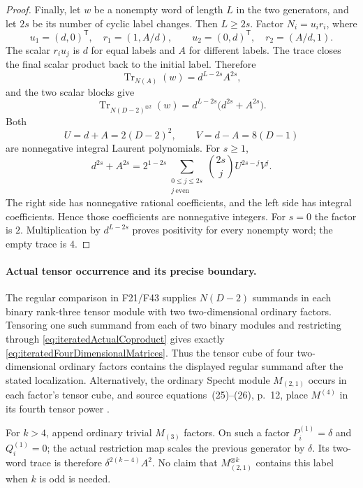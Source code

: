 \documentclass[11pt,a4paper]{article}
\newcommand{\fid}[1]{\textsf{#1}}\newcommand{\gate}[1]{\textsf{#1}}
\theoremstyle{named}\newtheorem{finding}{Finding}[section]
\theoremstyle{definition}\newtheorem{definition}[finding]{Definition}
\theoremstyle{remark}\newtheorem{remark}[finding]{Remark}
\begin{document}
\begin{proof}
Finally, let \(w\) be a nonempty word of length \(L\) in
the two generators, and let \(2s\) be its number of cyclic
label changes. Then \(L\ge2s\). Factor
\(N_i=u_i r_i\), where
\[
 u_1=(d,0)^{\mathsf T},\quad r_1=(1,A/d),\qquad
 u_2=(0,d)^{\mathsf T},\quad r_2=(A/d,1).
\]
The scalar \(r_i u_j\) is \(d\) for equal labels and
\(A\) for different labels. The trace closes the final
scalar product back to the initial label. Therefore
\[
 \operatorname{Tr}_{N(A)}(w)=d^{L-2s}A^{2s},
\]
and the two scalar blocks give
\begin{equation}\label{eq:iteratedAllWordTrace}
 \operatorname{Tr}_{N(D-2)^{\otimes2}}(w)
          =d^{L-2s}\bigl(d^{2s}+A^{2s}\bigr).
\end{equation}
Both
\[
 U=d+A=2(D-2)^2,\qquad V=d-A=8(D-1)
\]
are nonnegative integral Laurent polynomials. For \(s\ge1\),
\[
 d^{2s}+A^{2s}
   =2^{1-2s}
      \sum_{\substack{0\le j\le2s\\ j\ \mathrm{even}}}
        \binom{2s}{j}U^{2s-j}V^j.
\]
The right side has nonnegative rational coefficients,
and the left side has integral coefficients. Hence those
coefficients are nonnegative integers. For \(s=0\) the
factor is \(2\). Multiplication by \(d^{L-2s}\) proves
positivity for every nonempty word; the empty trace is \(4\).
\end{proof}

\paragraph{Actual tensor occurrence and its precise boundary.}
The regular comparison in \fid{F21}/\fid{F43} supplies
\(N(D-2)\) summands in each binary rank-three tensor module
with two two-dimensional ordinary factors.
Tensoring one such summand from each of two binary
modules and restricting through
\eqref{eq:iteratedActualCoproduct} gives exactly
\eqref{eq:iteratedFourDimensionalMatrices}.
Thus the tensor cube of four two-dimensional ordinary
factors contains the displayed regular summand after
the stated localization.
Alternatively, the ordinary Specht module \(M_{(2,1)}\)
occurs in each factor's tensor cube, and source
equations~(25)--(26), p.~12, place \(M^{(4)}\) in its
fourth tensor power \cite{BlasiakChebyshev}.

For \(k>4\), append ordinary trivial \(M_{(3)}\) factors.
On such a factor \(P_i^{(1)}=\delta\) and \(Q_i^{(1)}=0\);
the actual restriction map scales the previous generator
by \(\delta\). Its two-word trace is therefore
\(\delta^{2(k-4)}A^2\).
No claim that \(M_{(2,1)}^{\otimes k}\) contains this
label when \(k\) is odd is needed.
\end{document}
